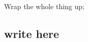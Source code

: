 \documentclass[conference,final]{IEEEtran}
\begin{document}
Wrap the whole thing up;
\subsection{write here}



\end{document}
